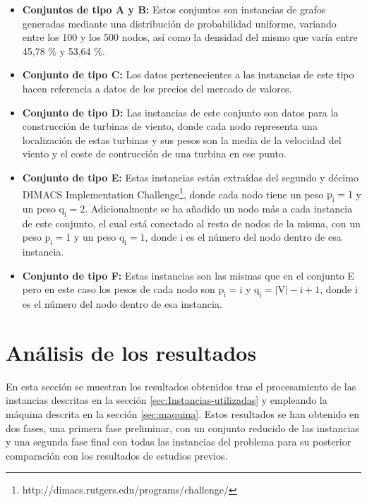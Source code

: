 \begin{itemize}
	
	\item \textbf{Conjuntos de tipo A y B:} Estos conjuntos son instancias de grafos generadas mediante una distribución de probabilidad uniforme, variando entre los 100 y los 500 nodos, así como la densidad del mismo que varía entre 45,78 \% y 53,64 \%.
	\item  \textbf{Conjunto de tipo C:} Los datos pertenecientes a las instancias de este tipo hacen referencia a datos de los precios del mercado de valores.
	\item  \textbf{Conjunto de tipo D:} Las instancias de este conjunto son datos para la construcción de turbinas de viento, donde cada nodo representa una localización de estas turbinas y sus pesos son la media de la velocidad del viento y el coste de contrucción de una turbina en ese punto.
	\item  \textbf{Conjunto de tipo E:} Estas instancias están extraídas del segundo y décimo DIMACS Implementation Challenge\footnote{http://dimacs.rutgers.edu/programs/challenge/}, donde cada nodo tiene un peso $\mathrm{p_{i} = 1}$ y un peso $\mathrm{q_{i} = 2}$. Adicionalmente se ha añadido un nodo más a cada instancia de este conjunto, el cual está conectado al resto de nodos de la misma, con un peso $\mathrm{p_{i} = 1}$ y un peso $\mathrm{q_{i} = 1}$, donde i es el número del nodo dentro de esa instancia.
	\item  \textbf{Conjunto de tipo F:} Estas instancias son las mismas que en el conjunto E pero en este caso los pesos de cada nodo son $\mathrm{p_{i} = i}$ y $\mathrm{q_{i} = |V| - i + 1}$, donde i es el número del nodo dentro de esa instancia.
	
	
\end{itemize}


\section{Análisis de los resultados}
En esta sección se muestran los resultados obtenidos tras el procesamiento de las instancias descritas en la sección \ref{sec:Instancias-utilizadas} y empleando la máquina descrita en la sección \ref{sec:maquina}. Estos resultados se han obtenido en dos fases, una primera fase preliminar, con un conjunto reducido de las instancias y una segunda fase final con todas las instancias del problema para su posterior comparación con los resultados de estudios previos.

